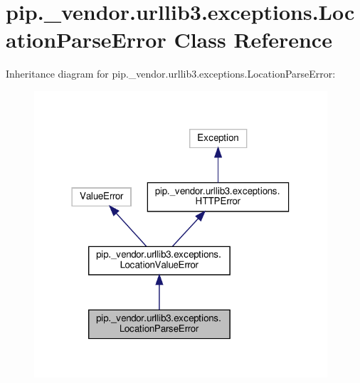 \hypertarget{classpip_1_1__vendor_1_1urllib3_1_1exceptions_1_1LocationParseError}{}\section{pip.\+\_\+vendor.\+urllib3.\+exceptions.\+Location\+Parse\+Error Class Reference}
\label{classpip_1_1__vendor_1_1urllib3_1_1exceptions_1_1LocationParseError}


Inheritance diagram for pip.\+\_\+vendor.\+urllib3.\+exceptions.\+Location\+Parse\+Error\+:
\nopagebreak
\begin{figure}[H]
\begin{center}
\leavevmode
\includegraphics[width=309pt]{classpip_1_1__vendor_1_1urllib3_1_1exceptions_1_1LocationParseError__inherit__graph}
\end{center}
\end{figure}


